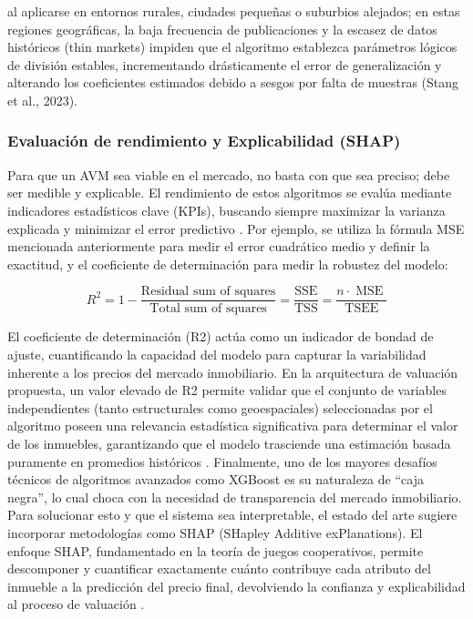 al aplicarse en entornos rurales, ciudades pequeñas o suburbios alejados; en estas regiones geográficas, la baja frecuencia de publicaciones y la escasez de datos históricos (thin markets) impiden que el algoritmo establezca parámetros lógicos de división estables, incrementando drásticamente el error de generalización y alterando los coeficientes estimados debido a sesgos por falta de muestras (Stang et al., 2023).

\subsubsection{Evaluación de rendimiento y Explicabilidad (SHAP)}

Para que un AVM sea viable en el mercado, no basta con que sea preciso; debe ser medible y explicable. El rendimiento de estos algoritmos se evalúa mediante indicadores estadísticos clave (KPIs), buscando siempre maximizar la varianza explicada y minimizar el error predictivo \parencite{ElJaouhariEtAl2024}. Por ejemplo, se utiliza la fórmula MSE mencionada anteriormente para medir el error cuadrático medio y definir la exactitud, y el coeficiente de determinación para medir la robustez del modelo:

\[
R^2 = 1 - \frac{\text{Residual sum of squares}}{\text{Total sum of squares}} = \frac{\text{SSE}}{\text{TSS}} = \frac{n\cdot \operatorname{MSE}}{\text{TSEE}}
\]

El coeficiente de determinación (R2) actúa como un indicador de bondad de ajuste, cuantificando la capacidad del modelo para capturar la variabilidad inherente a los precios del mercado inmobiliario. En la arquitectura de valuación propuesta, un valor elevado de R2 permite validar que el conjunto de variables independientes (tanto estructurales como geoespaciales) seleccionadas por el algoritmo poseen una relevancia estadística significativa para determinar el valor de los inmuebles, garantizando que el modelo trasciende una estimación basada puramente en promedios históricos \parencite{KokEtAl2017}. Finalmente, uno de los mayores desafíos técnicos de algoritmos avanzados como XGBoost es su naturaleza de ``caja negra'', lo cual choca con la necesidad de transparencia del mercado inmobiliario. Para solucionar esto y que el sistema sea interpretable, el estado del arte sugiere incorporar metodologías como SHAP (SHapley Additive exPlanations). El enfoque SHAP, fundamentado en la teoría de juegos cooperativos, permite descomponer y cuantificar exactamente cuánto contribuye cada atributo del inmueble a la predicción del precio final, devolviendo la confianza y explicabilidad al proceso de valuación \parencite{LundbergLee2017}.

